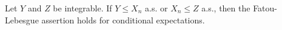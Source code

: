 Let $Y$ and $Z$ be integrable. If $Y \leq X_n$ a.s. or $X_n \leq Z$ a.s., then the Fatou-Lebesgue assertion holds for conditional expectations.
